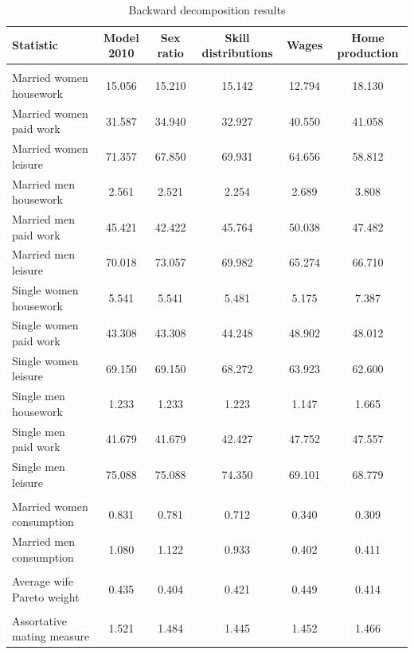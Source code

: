 \documentclass[12pt]{article}
\begin{document}
\begin{table}
	\centering
	\caption{Backward decomposition results}
	\begin{tabular}{lccccc}
		\toprule
		Statistic & Model 2010 & Sex ratio & Skill distributions & Wages & Home production \\
		\midrule
		&       &       &       &       &  \\
		Married women housework & 15.056 & 15.210 & 15.142 & 12.794 & 18.130 \\
		Married women paid work & 31.587 & 34.940 & 32.927 & 40.550 & 41.058 \\
		Married women leisure & 71.357 & 67.850 & 69.931 & 64.656 & 58.812 \\
		Married men housework & 2.561 & 2.521 & 2.254 & 2.689 & 3.808 \\
		Married men paid work & 45.421 & 42.422 & 45.764 & 50.038 & 47.482 \\
		Married men leisure & 70.018 & 73.057 & 69.982 & 65.274 & 66.710 \\
		Single women housework & 5.541 & 5.541 & 5.481 & 5.175 & 7.387 \\
		Single women paid work & 43.308 & 43.308 & 44.248 & 48.902 & 48.012 \\
		Single women leisure & 69.150 & 69.150 & 68.272 & 63.923 & 62.600 \\
		Single men housework & 1.233 & 1.233 & 1.223 & 1.147 & 1.665 \\
		Single men paid work & 41.679 & 41.679 & 42.427 & 47.752 & 47.557 \\
		Single men leisure & 75.088 & 75.088 & 74.350 & 69.101 & 68.779 \\
		&       &       &       &       &  \\
		Married women consumption & 0.831 & 0.781 & 0.712 & 0.340 & 0.309 \\
		Married men consumption & 1.080 & 1.122 & 0.933 & 0.402 & 0.411 \\
		&       &       &       &       &  \\
		Average wife Pareto weight & 0.435 & 0.404 & 0.421 & 0.449 & 0.414 \\
		&       &       &       &       &  \\
		Assortative mating measure & 1.521 & 1.484 & 1.445 & 1.452 & 1.466 \\
		\bottomrule
		\bottomrule
	\end{tabular}
	\label{tab:back_decomp}
\end{table}
\end{document}
